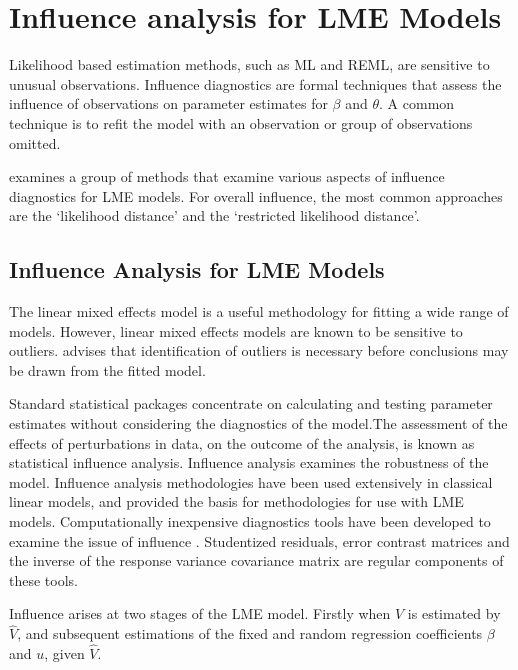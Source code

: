 \documentclass[12pt, a4paper]{article}
\begin{document}
	\section{Influence analysis for LME Models} %
	
	Likelihood based estimation methods, such as ML and REML, are sensitive to unusual observations. Influence diagnostics are formal techniques that assess the influence of observations on parameter estimates for $\beta$ and $\theta$. A common technique is to refit the model with an observation or group of observations omitted.
	
	\citet{west} examines a group of methods that examine various aspects of influence diagnostics for LME models.
	For overall influence, the most common approaches are the `likelihood distance' and the `restricted likelihood distance'.
	
	
	\subsection{Influence Analysis for LME Models} %
	The linear mixed effects model is a useful methodology for fitting a wide range of models. However, linear mixed effects models are known to be sensitive to outliers. \citet{CPJ} advises that identification of outliers is necessary before conclusions may be drawn from the fitted model.
	
	Standard statistical packages concentrate on calculating and testing parameter estimates without considering the diagnostics of the model.The assessment of the effects of perturbations in data, on the outcome of the analysis, is known as statistical influence analysis. Influence analysis examines the robustness of the model. Influence analysis methodologies have been used extensively in classical linear models, and provided the basis for methodologies for use with LME models.
	Computationally inexpensive diagnostics tools have been developed to examine the issue of influence \citep{Zewotir}.
	Studentized residuals, error contrast matrices and the inverse of the response variance covariance matrix are regular components of these tools.
	
	Influence arises at two stages of the LME model. Firstly when $V$ is estimated by $\hat{V}$, and subsequent
	estimations of the fixed and random regression coefficients $\beta$ and $u$, given $\hat{V}$.
	
	
\end{document}

